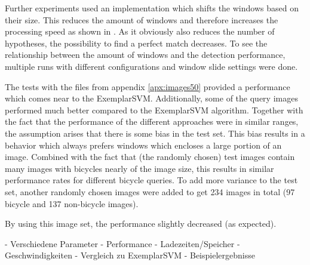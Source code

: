 Further experiments used an implementation which shifts the windows based on their size. This reduces the amount of windows and therefore increases the processing speed as shown in .
As it obviously also reduces the number of hypotheses, the possibility to find a perfect match decreases. To see the relationship between the amount of windows and the detection performance, multiple runs with different configurations and window slide settings were done.

The tests with the files from appendix \ref{apx:images50} provided a performance which comes near to the ExemplarSVM. Additionally, some of the query images performed much better compared to the ExemplarSVM algorithm. Together with the fact that the performance of the different approaches were in similar ranges, the assumption arises that there is some bias in the test set. This bias results in a behavior which always prefers windows which encloses a large portion of an image. Combined with the fact that (the randomly chosen) test images contain many images with bicycles nearly of the image size, this results in similar performance rates for different bicycle queries. To add more variance to the test set, another randomly chosen images were added to get 234 images in total (97 bicycle and 137 non-bicycle images).

By using this image set, the performance slightly decreased (as expected). 

- Verschiedene Parameter
- Performance
- Ladezeiten/Speicher
- Geschwindigkeiten
- Vergleich zu ExemplarSVM
- Beispielergebnisse
